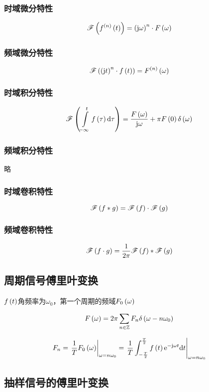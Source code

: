 \documentclass{article}
\begin{document}
\subsubsection{时域微分特性}

\[\mathscr F\left(f^{\left(n\right)}\left(t\right)\right)=\left(\mathrm j\omega\right)^n\cdot F\left(\omega\right)\]

\subsubsection{频域微分特性}

\[\mathscr F\left(\left(\mathrm j t\right)^n\cdot f\left(t\right)\right)=F^{\left(n\right)}\left(\omega\right)\]

\subsubsection{时域积分特性}

\[\mathscr F\left(\int\limits_{-\infty}^tf\left(\tau\right)\mathrm d\tau\right)=\frac{F\left(\omega\right)}{\mathrm j\omega}+\pi F\left(0\right)\delta\left(\omega\right)\]

\subsubsection{频域积分特性}

略

\subsubsection{时域卷积特性}

\[\mathscr F\left(f\ast g\right)=\mathscr F\left(f\right)\cdot\mathscr F\left(g\right)\]

\subsubsection{频域卷积特性}

\[\mathscr F\left(f\cdot g\right)=\frac1{2\pi}\mathscr F\left(f\right)\ast\mathscr F\left(g\right)\]

\subsection{周期信号傅里叶变换}

$f\left(t\right)$角频率为$\omega_0$，第一个周期的频域$F_0\left(\omega\right)$

\[F\left(\omega\right)=2\pi\sum_{n\in\mathbb Z} F_n\delta\left(\omega-n\omega_0\right)\]

\[F_n=\left.\frac1TF_0\left(\omega\right)\right|_{\omega=n\omega_0}=\left.\frac1T\int_{-\frac T2}^{\frac T2}f\left(t\right)\mathrm e^{-\mathrm j\omega t}\mathrm d t\right|_{\omega=n\omega_0}\]

\subsection{抽样信号的傅里叶变换}
\end{document}
